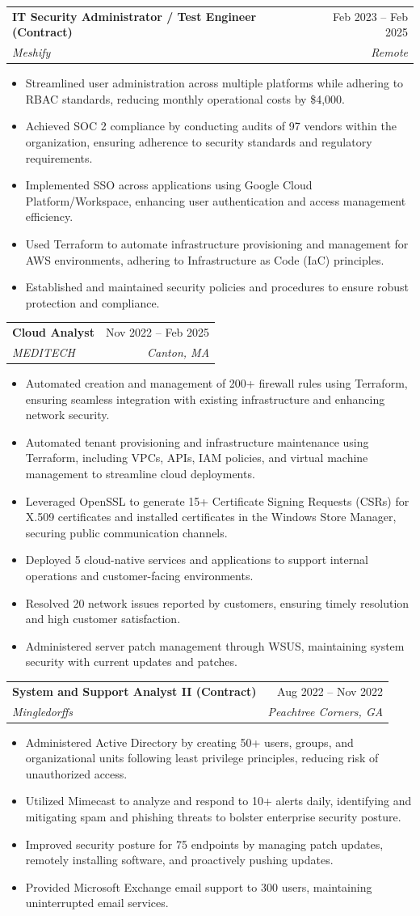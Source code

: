 \documentclass[letterpaper,10pt]{article}
\makeatletter
\newcommand{\resumeItem}[1]{
  \item\small{
    {#1 \vspace{-2pt}}
  }
}
\newcommand{\resumeSubheading}[4]{
  \vspace{-2pt}\item
    \begin{tabular*}{0.97\textwidth}[t]{l@{\extracolsep{\fill}}r}
      \textbf{#1} & #2 \\
      \textit{\small#3} & \textit{\small #4} \\
    \end{tabular*}\vspace{-7pt}
}
\newcommand{\resumeItemListStart}{\begin{itemize}}
\newcommand{\resumeItemListEnd}{\end{itemize}\vspace{-5pt}}
\makeatother
\begin{document}
  \resumeSubheading
      {IT Security Administrator / Test Engineer (Contract)}{Feb 2023 -- Feb 2025}
      {Meshify}{Remote}
      \resumeItemListStart
        \resumeItem{Streamlined user administration across multiple platforms while adhering to RBAC standards, reducing monthly operational costs by \$4,000.}
        \resumeItem{Achieved SOC 2 compliance by conducting audits of 97 vendors within the organization, ensuring adherence to security standards and regulatory requirements.}
        \resumeItem{Implemented SSO across applications using Google Cloud Platform/Workspace, enhancing user authentication and access management efficiency.}
        \resumeItem{Used Terraform to automate infrastructure provisioning and management for AWS environments, adhering to Infrastructure as Code (IaC) principles.}
        \resumeItem{Established and maintained security policies and procedures to ensure robust protection and compliance.}
      \resumeItemListEnd

    \resumeSubheading
      {Cloud Analyst}{Nov 2022 -- Feb 2025}
      {MEDITECH}{Canton, MA}
      \resumeItemListStart
        \resumeItem{Automated creation and management of 200+ firewall rules using Terraform, ensuring seamless integration with existing infrastructure and enhancing network security.}
        \resumeItem{Automated tenant provisioning and infrastructure maintenance using Terraform, including VPCs, APIs, IAM policies, and virtual machine management to streamline cloud deployments.}
        \resumeItem{Leveraged OpenSSL to generate 15+ Certificate Signing Requests (CSRs) for X.509 certificates and installed certificates in the Windows Store Manager, securing public communication channels.}
        \resumeItem{Deployed 5 cloud-native services and applications to support internal operations and customer-facing environments.}
        \resumeItem{Resolved 20 network issues reported by customers, ensuring timely resolution and high customer satisfaction.}
        \resumeItem{Administered server patch management through WSUS, maintaining system security with current updates and patches.}
    \resumeItemListEnd

    \resumeSubheading
      {System and Support Analyst II (Contract)}{Aug 2022 -- Nov 2022}
      {Mingledorffs}{Peachtree Corners, GA}
      \resumeItemListStart
        \resumeItem{Administered Active Directory by creating 50+ users, groups, and organizational units following least privilege principles, reducing risk of unauthorized access.}
        \resumeItem{Utilized Mimecast to analyze and respond to 10+ alerts daily, identifying and mitigating spam and phishing threats to bolster enterprise security posture.}
        \resumeItem{Improved security posture for 75 endpoints by managing patch updates, remotely installing software, and proactively pushing updates.}
        \resumeItem{Provided Microsoft Exchange email support to 300 users, maintaining uninterrupted email services.}
    \resumeItemListEnd
\end{document}
